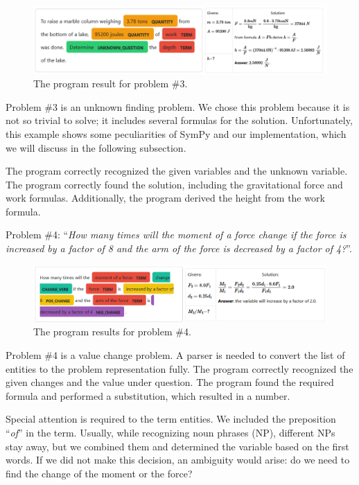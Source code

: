 \documentclass[a4paper, 12pt]{article}
\newcommand{\etext}[1]{\enquote{\textit{#1}}}
\begin{document}
	\begin{figure}[h]
		\centering
		\includegraphics[width=\textwidth]{media/image7.png}
		\caption{The program result for problem \#3.}
	\end{figure}
	
	Problem \#3 is an unknown finding problem. We chose this problem because
	it is not so trivial to solve; it includes several formulas for the
	solution. Unfortunately, this example shows some peculiarities of SymPy
	and our implementation, which we will discuss in the following
	subsection.
	
	The program correctly recognized the given variables and the unknown
	variable. The program correctly found the solution, including the
	gravitational force and work formulas. Additionally, the program derived
	the height from the work formula.
	
	Problem \#4: \etext{How many times will the moment of a force change if
	the force is increased by a factor of 8 and the arm of the force is
	decreased by a factor of 4?}.
	
	\begin{figure}[h]
		\centering
		\includegraphics[width=\textwidth]{media/image8.png}
		\caption{The program results for problem \#4.}
	\end{figure}
	
	Problem \#4 is a value change problem. A parser is needed to convert the
	list of entities to the problem representation fully. The program
	correctly recognized the given changes and the value under question. The
	program found the required formula and performed a substitution, which
	resulted in a number.
	
	Special attention is required to the term entities. We included the
	preposition \etext{of} in the term. Usually, while recognizing noun
	phrases (NP), different NPs stay away, but we combined them and
	determined the variable based on the first words. If we did not make
	this decision, an ambiguity would arise: do we need to find the change
	of the moment or the force?
	
\end{document}
